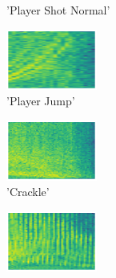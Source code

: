 \begin{figure}[H]
{\begin{subfigure}{0.23\textwidth}
{{        }\hspace*{0.75cm}%
      }%
      \caption*{'Player Shot Normal'}
    \end{subfigure}
    \begin{subfigure}{0.23\textwidth}
      \includegraphics[width=3cm]{sounds/buttons/07.wav-button.png}%
      \caption*{'Player Jump'}
    \end{subfigure}
    \begin{subfigure}{0.23\textwidth}
      \includegraphics[width=3cm]{sounds/buttons/08.wav-button.png}%
      \caption*{'Crackle'}
    \end{subfigure}
    \begin{subfigure}{0.23\textwidth}
      \includegraphics[width=3cm]{sounds/buttons/09.wav-button.png}%
\end{subfigure}}
\end{figure}
